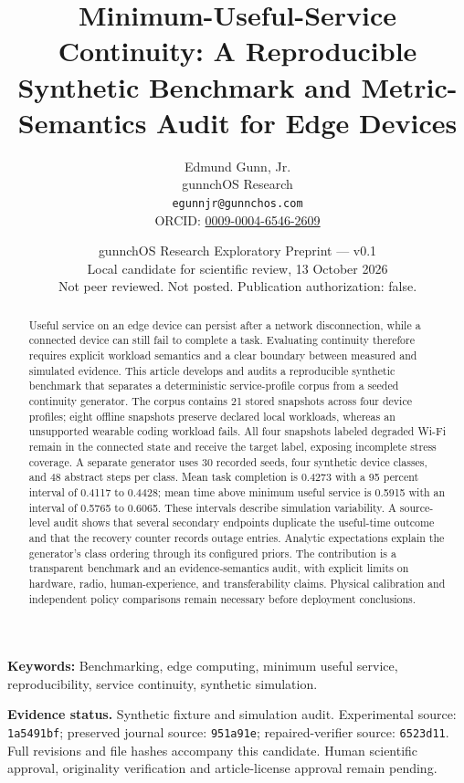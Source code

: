 \documentclass[10pt,twocolumn]{article}
\title{Minimum-Useful-Service Continuity: A Reproducible Synthetic Benchmark and Metric-Semantics Audit for Edge Devices}
\author{Edmund Gunn, Jr.\\gunnchOS Research\\\texttt{egunnjr@gunnchos.com}\\ORCID: \href{https://orcid.org/0009-0004-6546-2609}{0009-0004-6546-2609}}
\date{gunnchOS Research Exploratory Preprint --- v0.1\\Local candidate for scientific review, 13 October 2026\\Not peer reviewed. Not posted. Publication authorization: false.}
\begin{document}
\maketitle
\begin{abstract}

Useful service on an edge device can persist after a network disconnection, while a connected device can still fail to complete a task. Evaluating continuity therefore requires explicit workload semantics and a clear boundary between measured and simulated evidence. This article develops and audits a reproducible synthetic benchmark that separates a deterministic service-profile corpus from a seeded continuity generator. The corpus contains 21 stored snapshots across four device profiles; eight offline snapshots preserve declared local workloads, whereas an unsupported wearable coding workload fails. All four snapshots labeled degraded Wi-Fi remain in the connected state and receive the target label, exposing incomplete stress coverage. A separate generator uses 30 recorded seeds, four synthetic device classes, and 48 abstract steps per class. Mean task completion is 0.4273 with a 95 percent interval of 0.4117 to 0.4428; mean time above minimum useful service is 0.5915 with an interval of 0.5765 to 0.6065. These intervals describe simulation variability. A source-level audit shows that several secondary endpoints duplicate the useful-time outcome and that the recovery counter records outage entries. Analytic expectations explain the generator's class ordering through its configured priors. The contribution is a transparent benchmark and an evidence-semantics audit, with explicit limits on hardware, radio, human-experience, and transferability claims. Physical calibration and independent policy comparisons remain necessary before deployment conclusions.

\end{abstract}
\noindent\textbf{Keywords:} 
Benchmarking, edge computing, minimum useful service, reproducibility, service continuity, synthetic simulation.


\noindent\textbf{Evidence status.} Synthetic fixture and simulation audit. Experimental source: \texttt{1a5491bf}; preserved journal source: \texttt{951a91e}; repaired-verifier source: \texttt{6523d11}. Full revisions and file hashes accompany this candidate. Human scientific approval, originality verification and article-license approval remain pending.












\end{document}
